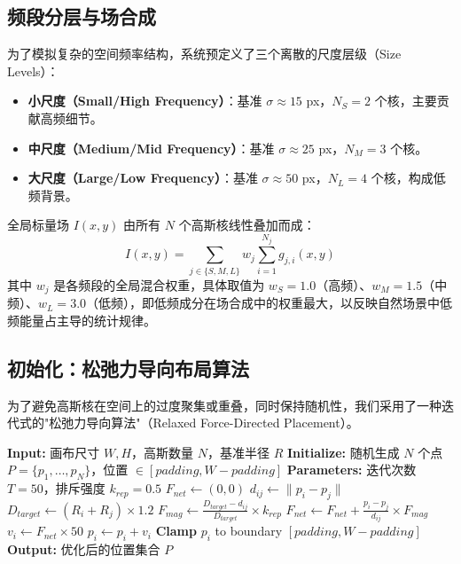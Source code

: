 \documentclass{article}
\begin{document}
\subsection{频段分层与场合成}
为了模拟复杂的空间频率结构，系统预定义了三个离散的尺度层级（Size Levels）：
\begin{itemize}
    \item \textbf{小尺度（Small/High Frequency）}：基准 $\sigma \approx 15$ px，$N_S = 2$ 个核，主要贡献高频细节。
    \item \textbf{中尺度（Medium/Mid Frequency）}：基准 $\sigma \approx 25$ px，$N_M = 3$ 个核。
    \item \textbf{大尺度（Large/Low Frequency）}：基准 $\sigma \approx 50$ px，$N_L = 4$ 个核，构成低频背景。
\end{itemize}
全局标量场 $I(x, y)$ 由所有 $N$ 个高斯核线性叠加而成：
\begin{equation}
I(x, y) = \sum_{j \in \{S, M, L\}} w_j \sum_{i=1}^{N_j} g_{j,i}(x, y)
\end{equation}
其中 $w_j$ 是各频段的全局混合权重，具体取值为 $w_S = 1.0$（高频）、$w_M = 1.5$（中频）、$w_L = 3.0$（低频），即低频成分在场合成中的权重最大，以反映自然场景中低频能量占主导的统计规律。

\subsection{初始化：松弛力导向布局算法}
为了避免高斯核在空间上的过度聚集或重叠，同时保持随机性，我们采用了一种迭代式的"松弛力导向算法"（Relaxed Force-Directed Placement）。
\begin{algorithm}[H]
\caption{力导向高斯布局生成}
\begin{algorithmic}[1]
\State \textbf{Input:} 画布尺寸 $W, H$，高斯数量 $N$，基准半径 $R$
\State \textbf{Initialize:} 随机生成 $N$ 个点 $P = \{p_1, \dots, p_N\}$，位置 $\in [padding, W-padding]$
\State \textbf{Parameters:} 迭代次数 $T=50$，排斥强度 $k_{rep} = 0.5$
        \State $F_{net} \leftarrow (0, 0)$
            \State $d_{ij} \leftarrow \|p_i - p_j\|$
            \State $D_{target} \leftarrow (R_i + R_j) \times 1.2$ 
                \State $F_{mag} \leftarrow \frac{D_{target} - d_{ij}}{D_{target}} \times k_{rep}$ 
                \State $F_{net} \leftarrow F_{net} + \frac{p_i - p_j}{d_{ij}} \times F_{mag}$
            \EndIf
        \EndFor
        \State $v_i \leftarrow F_{net} \times 50$ 
        \State $p_i \leftarrow p_i + v_i$
        \State \textbf{Clamp} $p_i$ to boundary $[padding, W-padding]$
    \EndFor
\EndFor
\State \textbf{Output:} 优化后的位置集合 $P$
\end{algorithmic}
\end{algorithm}
\end{document}
